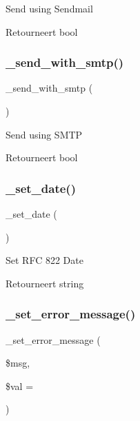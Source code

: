 Send using Sendmail

\begin{DoxyReturn}{Retourneert}
bool 
\end{DoxyReturn}
\mbox{\label{class_c_i___email_a691e57a39f6f8956c5054fd7b109bb12}} 
\subsubsection{\texorpdfstring{\_send\_with\_smtp()}{\_send\_with\_smtp()}}
{\footnotesize\ttfamily \+\_\+send\+\_\+with\+\_\+smtp (\begin{DoxyParamCaption}{ }\end{DoxyParamCaption})\hspace{0.3cm}{\ttfamily [protected]}}

Send using S\+M\+TP

\begin{DoxyReturn}{Retourneert}
bool 
\end{DoxyReturn}
\mbox{\label{class_c_i___email_a0c25effa0066e09273d092572709f6eb}} 
\subsubsection{\texorpdfstring{\_set\_date()}{\_set\_date()}}
{\footnotesize\ttfamily \+\_\+set\+\_\+date (\begin{DoxyParamCaption}{ }\end{DoxyParamCaption})\hspace{0.3cm}{\ttfamily [protected]}}

Set R\+FC 822 Date

\begin{DoxyReturn}{Retourneert}
string 
\end{DoxyReturn}
\mbox{\label{class_c_i___email_a5f00196f0653becd7f5a7a590eaf0085}} 
\subsubsection{\texorpdfstring{\_set\_error\_message()}{\_set\_error\_message()}}
{\footnotesize\ttfamily \+\_\+set\+\_\+error\+\_\+message (\begin{DoxyParamCaption}\item[{}]{\$msg,  }\item[{}]{\$val = {\ttfamily \textquotesingle{}\textquotesingle{}} }\end{DoxyParamCaption})\hspace{0.3cm}{\ttfamily [protected]}}

